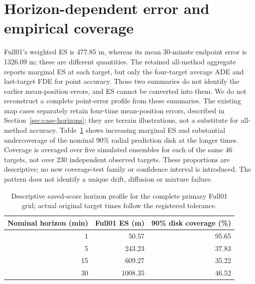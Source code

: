 \section{Horizon-dependent error and empirical coverage}
Full01's weighted ES is 477.85 m, whereas its mean 30-minute endpoint error
is 1326.09 m; these are different quantities.
The retained all-method aggregate reports marginal ES at each target, but
only the four-target average ADE and last-target FDE for point accuracy.
Those two summaries do not identify the earlier mean-position errors, and
ES cannot be converted into them. We do not reconstruct a complete point-error
profile from these summaries. The existing map cases separately retain
four-time mean-position errors, described in Section~\ref{sec:case-horizons};
they are terrain illustrations, not a substitute for all-method accuracy.
Table~\ref{tab:preliminary-coverage} shows increasing marginal ES and substantial
undercoverage of the nominal 90\% radial prediction disk at the longer times.
Coverage is averaged over five simulated ensembles for each of the same
46 targets, not over 230 independent observed targets. These proportions are
descriptive; no new coverage-test family or confidence interval is introduced.
The pattern does not identify a unique drift, diffusion or mixture failure.

\begin{table}[htbp]
\centering
\small
\caption{Descriptive saved-score horizon profile for the complete primary
Full01 grid; actual original target times follow the registered tolerance.}
\label{tab:preliminary-coverage}\hypertarget{tab:preliminary-coverage}{}
\begin{tabular}{@{}rrr@{}}
\toprule
Nominal horizon (min) & Full01 ES (m) & 90\% disk coverage (\%)\\
\midrule
1 & 50.57 & 95.65\\
5 & 243.23 & 37.83\\
15 & 609.27 & 35.22\\
30 & 1008.35 & 46.52\\
\bottomrule
\end{tabular}
\end{table}

